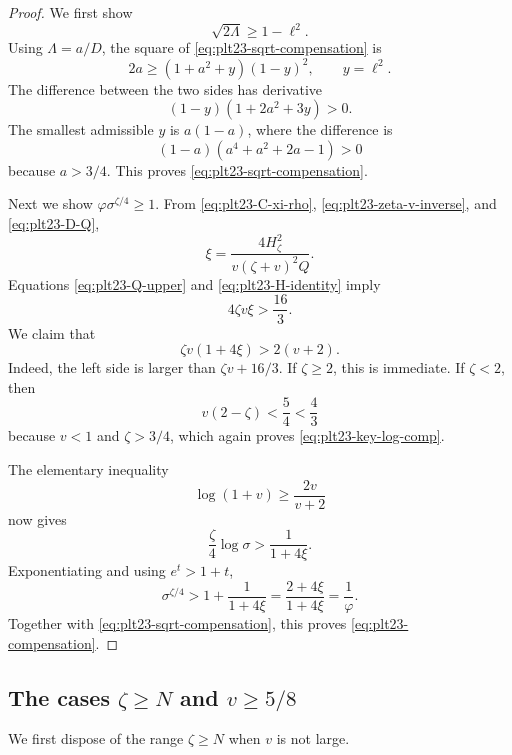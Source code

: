 \documentclass[11pt]{article}
\numberwithin{equation}{section}
\begin{document}
\begin{proof}
  We first show
  \begin{equation}\label{eq:plt23-sqrt-compensation}
    \sqrt{2\Lambda}\ge1-\ell^2.
  \end{equation}
  Using $\Lambda=a/D$, the square of \eqref{eq:plt23-sqrt-compensation} is
  \[
    2a\ge(1+a^2+y)(1-y)^2,
    \qquad y=\ell^2.
  \]
  The difference between the two sides has derivative
  \[
    (1-y)(1+2a^2+3y)>0.
  \]
  The smallest admissible $y$ is $a(1-a)$, where the difference is
  \[
    (1-a)(a^4+a^2+2a-1)>0
  \]
  because $a>3/4$.
  This proves \eqref{eq:plt23-sqrt-compensation}.

  Next we show $\varphi\sigma^{\zeta/4}\ge1$.
  From \eqref{eq:plt23-C-xi-rho}, \eqref{eq:plt23-zeta-v-inverse}, and \eqref{eq:plt23-D-Q},
  \begin{equation}\label{eq:plt23-xi-zeta-v}
    \xi=\frac{4H_\zeta^2}
    {v(\zeta+v)^2Q}.
  \end{equation}
  Equations \eqref{eq:plt23-Q-upper} and \eqref{eq:plt23-H-identity} imply
  \begin{equation}\label{eq:plt23-xi-comp-bound}
    4\zeta v\xi>\frac{16}{3}.
  \end{equation}
  We claim that
  \begin{equation}\label{eq:plt23-key-log-comp}
    \zeta v(1+4\xi)>2(v+2).
  \end{equation}
  Indeed, the left side is larger than $\zeta v+16/3$.
  If $\zeta\ge2$, this is immediate.
  If $\zeta<2$, then
  \[
    v(2-\zeta)<\frac{5}{4}<\frac{4}{3}
  \]
  because $v<1$ and $\zeta>3/4$, which again proves \eqref{eq:plt23-key-log-comp}.

  The elementary inequality
  \[
    \log(1+v)\ge\frac{2v}{v+2}
  \]
  now gives
  \[
    \frac{\zeta}{4}\log\sigma>
    \frac{1}{1+4\xi}.
  \]
  Exponentiating and using $e^t>1+t$,
  \[
    \sigma^{\zeta/4}>
    1+\frac{1}{1+4\xi}
    =\frac{2+4\xi}{1+4\xi}=\frac{1}{\varphi}.
  \]
  Together with \eqref{eq:plt23-sqrt-compensation}, this proves \eqref{eq:plt23-compensation}.
\end{proof}

\subsection{The cases \texorpdfstring{$\zeta\ge N$}{zeta >= N} and \texorpdfstring{$v\ge5/8$}{v >= 5/8}}

We first dispose of the range $\zeta\ge N$ when $v$ is not large.
\end{document}
